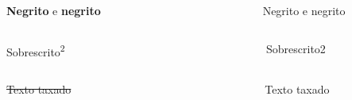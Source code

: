 \documentclass[
]{book}
\begin{document}
\begin{columns}

\begin{column}

\textbf{Negrito} e \textbf{negrito}

\end{column}

\begin{column}

~

\end{column}

\begin{column}

Negrito e negrito

\end{column}

\end{columns}

\begin{columns}

\begin{column}

Sobrescrito\textsuperscript{2}

\end{column}

\begin{column}

~

\end{column}

\begin{column}

Sobrescrito2

\end{column}

\end{columns}

\begin{columns}

\begin{column}

\sout{Texto taxado}

\end{column}

\begin{column}

~

\end{column}

\begin{column}

Texto taxado

\end{column}

\end{columns}
\end{document}
